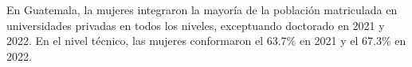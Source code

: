 En Guatemala, la mujeres integraron la mayoría de la población matriculada en universidades privadas en todos los niveles, exceptuando doctorado en 2021 y 2022. En el nivel técnico, las mujeres conformaron el 63.7\% en 2021 y el 67.3\% en 2022. 